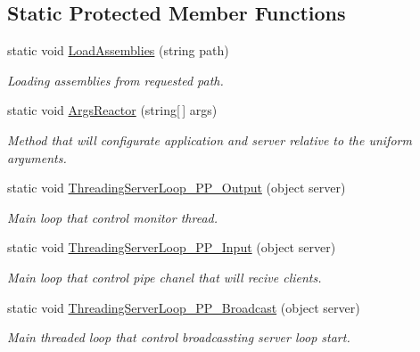 \subsection*{Static Protected Member Functions}
\begin{DoxyCompactItemize}
\item 
static void \mbox{\hyperlink{class_uniform_server_1_1_base_server_a22b92ad517cd1003fe4fe3c86d857169}{Load\+Assemblies}} (string path)
\begin{DoxyCompactList}\small\item\em Loading assemblies from requested path. \end{DoxyCompactList}\item 
static void \mbox{\hyperlink{class_uniform_server_1_1_base_server_a992660752da60019c348e18226a87bf2}{Args\+Reactor}} (string\mbox{[}$\,$\mbox{]} args)
\begin{DoxyCompactList}\small\item\em Method that will configurate application and server relative to the uniform arguments. \end{DoxyCompactList}\item 
static void \mbox{\hyperlink{class_uniform_server_1_1_base_server_a8e9e872bad891b2bc06a8caa6c09ebf9}{Threading\+Server\+Loop\+\_\+\+P\+P\+\_\+\+Output}} (object server)
\begin{DoxyCompactList}\small\item\em Main loop that control monitor thread. \end{DoxyCompactList}\item 
static void \mbox{\hyperlink{class_uniform_server_1_1_base_server_a6cf6b8472de3925d465737a7fc9a8842}{Threading\+Server\+Loop\+\_\+\+P\+P\+\_\+\+Input}} (object server)
\begin{DoxyCompactList}\small\item\em Main loop that control pipe chanel that will recive clients. \end{DoxyCompactList}\item 
static void \mbox{\hyperlink{class_uniform_server_1_1_base_server_ae3c371a7e7953333bb2aa5104fa8a72d}{Threading\+Server\+Loop\+\_\+\+P\+P\+\_\+\+Broadcast}} (object server)
\begin{DoxyCompactList}\small\item\em Main threaded loop that control broadcassting server loop start. \end{DoxyCompactList}\end{DoxyCompactItemize}
